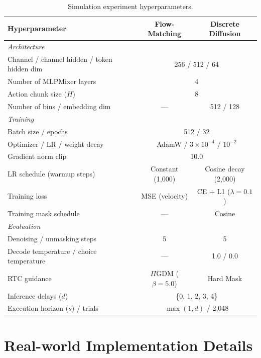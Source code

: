 \documentclass{article}
\begin{document}
\begin{table}[h]
\centering
\caption{Simulation experiment hyperparameters.}
\label{tab:hyperparams_sim}
\begin{tabular}{lcc}
\toprule
\textbf{Hyperparameter} & \textbf{Flow-Matching} & \textbf{Discrete Diffusion} \\
\midrule
\multicolumn{3}{l}{\textit{Architecture}} \\
Channel / channel hidden / token hidden dim & \multicolumn{2}{c}{256 / 512 / 64} \\
Number of MLPMixer layers & \multicolumn{2}{c}{4} \\
Action chunk size ($H$) & \multicolumn{2}{c}{8} \\
Number of bins / embedding dim & --- & 512 / 128 \\
\midrule
\multicolumn{3}{l}{\textit{Training}} \\
Batch size / epochs & \multicolumn{2}{c}{512 / 32} \\
Optimizer / LR / weight decay & \multicolumn{2}{c}{AdamW / $3 \times 10^{-4}$ / $10^{-2}$} \\
Gradient norm clip & \multicolumn{2}{c}{10.0} \\
LR schedule (warmup steps) & Constant (1{,}000) & Cosine decay (2{,}000) \\
Training loss & MSE (velocity) & CE + L1 ($\lambda{=}0.1$) \\
Training mask schedule & --- & Cosine \\
\midrule
\multicolumn{3}{l}{\textit{Evaluation}} \\
Denoising / unmasking steps & 5 & 5 \\
Decode temperature / choice temperature & --- & 1.0 / 0.0 \\
RTC guidance & $\Pi$GDM ($\beta{=}5.0$) & Hard Mask \\
Inference delays ($d$) & \multicolumn{2}{c}{\{0, 1, 2, 3, 4\}} \\
Execution horizon ($s$) / trials & \multicolumn{2}{c}{$\max(1, d)$ / 2{,}048} \\
\bottomrule
\end{tabular}
\end{table}

\newpage
\section{Real-world Implementation Details}
\label{app: realexp}
\end{document}
